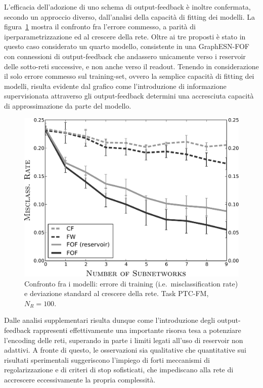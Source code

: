L'efficacia dell'adozione di uno schema di output-feedback è inoltre confermata, secondo un approccio diverso, dall'analisi della capacità di fitting dei modelli. 
La figura~\ref{fig:esperimenti:confronto} mostra il confronto fra l'errore commesso, a parità di iperparametrizzazione ed al crescere della rete. Oltre ai tre proposti è stato in questo caso considerato un quarto modello, consistente in una GraphESN-FOF con connessioni di output-feedback che andassero unicamente verso i reservoir delle sotto-reti successive, e non anche verso il readout. 
Tenendo in considerazione il solo errore commesso sul training-set, ovvero la semplice capacità di fitting dei modelli, risulta evidente dal grafico come l'introduzione di informazione supervisionata attraverso gli output-feedback determini una accresciuta capacità di approssimazione da parte del modello.
\begin{figure}[tbp]
\centering
\includegraphics[width=0.7\columnwidth]{img/confronto-modelli-v2}
\medskip
\caption[Confronto fra i modelli: errore di training]{Confronto fra i modelli: errore di training (i.e.\ misclassification rate) e deviazione standard al crescere della rete. Task PTC-FM, $N_R = 100$.}
\label{fig:esperimenti:confronto}
\end{figure}


Dalle analisi supplementari risulta dunque come l'introduzione degli output-feedback rappresenti effettivamente una importante risorsa tesa a potenziare l'encoding delle reti, superando in parte i limiti legati all'uso di reservoir non adattivi. A fronte di questo, le osservazioni sia qualitative che quantitative sui risultati sperimentali suggeriscono l'impiego di forti meccanismi di regolarizzazione e di criteri di stop sofisticati, che impediscano alla rete di accrescere eccessivamente la propria complessità.

